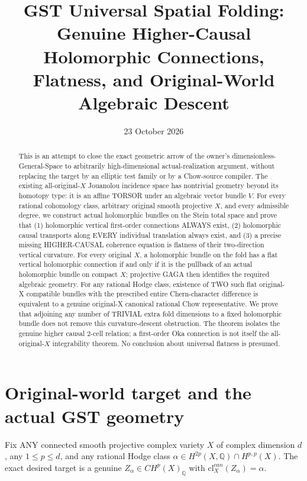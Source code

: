 \documentclass[11pt]{article}
\title{GST Universal Spatial Folding: Genuine Higher-Causal Holomorphic Connections, Flatness, and Original-World Algebraic Descent}
\date{23 October 2026}
\begin{document}
\maketitle

\begin{abstract}
This is an attempt to close the exact geometric arrow of the
owner's dimensionless-General-Space to arbitrarily high-dimensional
actual-realization argument, without replacing the target by
an elliptic test family or by a Chow-source compiler.
The existing all-original-$X$ Jouanolou incidence space has
nontrivial geometry beyond its homotopy type: it is an affine
TORSOR under an algebraic vector bundle $V$.
For every rational cohomology class, arbitrary original
smooth projective $X$, and every admissible degree, we construct
actual holomorphic bundles on the Stein total space and prove
that (1) holomorphic vertical first-order connections ALWAYS exist,
(2) holomorphic causal transports along EVERY individual translation
always exist, and (3) a precise missing HIGHER-CAUSAL coherence
equation is flatness of their two-direction vertical curvature.
For every original $X$, a holomorphic bundle on the fold has a
flat vertical holomorphic connection if and only if it is the
pullback of an actual holomorphic bundle on compact $X$;
projective GAGA then identifies the required algebraic
geometry. For any rational Hodge class, existence of TWO such
flat original-X compatible bundles with the prescribed entire
Chern-character difference is equivalent to a genuine original-X
canonical rational Chow representative.
We prove that adjoining any number of TRIVIAL extra fold
dimensions to a fixed holomorphic bundle does not remove this
curvature-descent obstruction.
The theorem isolates the genuine higher causal 2-cell relation;
a first-order Oka connection is not itself the all-original-$X$
integrability theorem. No conclusion about universal flatness
is presumed.
\end{abstract}

\section{Original-world target and the actual GST geometry}
Fix ANY connected smooth projective complex variety
$X$ of complex dimension $d$, any $1\le p\le d$,
and any rational Hodge class
$\alpha\in H^{2p}(X,\mathbb Q)\cap H^{p,p}(X)$.
The exact desired target is a genuine
$Z_\alpha\in CH^p(X)_{\mathbb Q}$ with
$\mathrm{cl}^{can}_X(Z_\alpha)=\alpha$.
\end{document}
